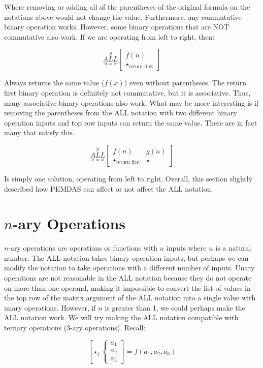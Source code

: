 \documentclass{article}
\begin{document}
Where removing or adding all of the parentheses of the original formula on the notations above would not change the value. Furthermore, any commutative binary operation works. However, some binary operations that are NOT commutative also work. If we are operating from left to right, then:

$$\underset{n=x}{\overset{y}{ALL}}
\begin{bmatrix}
f(n) \\
\star_{\text{return first}}
\end{bmatrix}$$

Always returns the same value ($f(x)$) even without parentheses. The return first binary operation is definitely not commutative, but it is associative. Thus, many associative binary operations also work. What may be more interesting is if removing the parentheses from the ALL notation with two different binary operation inputs and top row inputs can return the same value. There are in fact many that satisfy this.

$$\underset{n=x}{\overset{y}{ALL}}
\begin{bmatrix}
f(n) & g(n) \\
\star_{\text{return first}} & \star
\end{bmatrix}$$

Is simply one solution, operating from left to right. Overall, this section slightly described how PEMDAS can affect or not affect the ALL notation.

\section{$n$-ary Operations}

$n$-ary operations are operations or functions with $n$ inputs where $n$ is a natural number. The ALL notation takes binary operation inputs, but perhaps we can modify the notation to take operations with a different number of inputs. Unary operations are not reasonable in the ALL notation because they do not operate on more than one operand, making it impossible to convert the list of values in the top row of the matrix argument of the ALL notation into a single value with unary operations. However, if $n$ is greater than 1, we could perhaps make the ALL notation work. We will try making the ALL notation compatible with ternary operations (3-ary operations). Recall:

$$\left[ \star_f \left\{ \begin{array}{rcl}
a_1 \\ a_2 \\ a_3 \end{array}\right. \right] = f(a_1,a_2,a_3)$$
\end{document}
